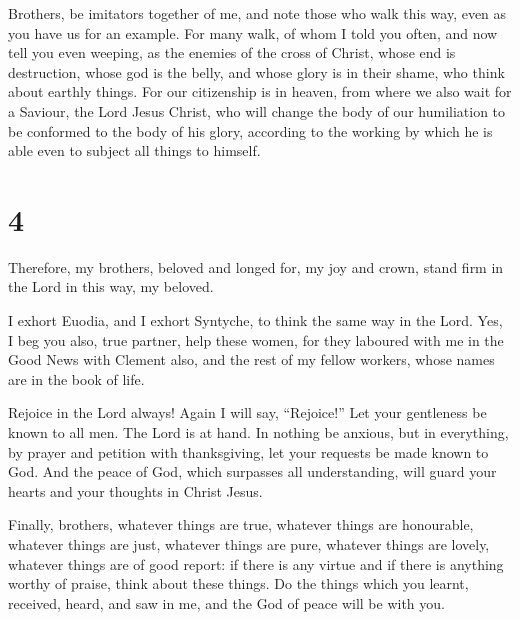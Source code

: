  Brothers, be imitators together of me, and note those who
walk this way, even as you have us for an example.  For
many walk, of whom I told you often, and now tell you even weeping, as
the enemies of the cross of Christ,  whose end is
destruction, whose god is the belly, and whose glory is in their shame,
who think about earthly things.  For our citizenship is in
heaven, from where we also wait for a Saviour, the Lord Jesus Christ,
 who will change the body of our humiliation to be
conformed to the body of his glory, according to the working by which he
is able even to subject all things to himself.

\hypertarget{section-3}{%
\section{4}\label{section-3}}

 Therefore, my brothers, beloved and longed for, my joy and
crown, stand firm in the Lord in this way, my beloved.

 I exhort Euodia, and I exhort Syntyche, to think the same
way in the Lord.  Yes, I beg you also, true partner, help
these women, for they laboured with me in the Good News with Clement
also, and the rest of my fellow workers, whose names are in the book of
life.

 Rejoice in the Lord always! Again I will say, ``Rejoice!''
 Let your gentleness be known to all men. The Lord is at
hand.  In nothing be anxious, but in everything, by prayer
and petition with thanksgiving, let your requests be made known to God.
 And the peace of God, which surpasses all understanding,
will guard your hearts and your thoughts in Christ Jesus.

 Finally, brothers, whatever things are true, whatever
things are honourable, whatever things are just, whatever things are
pure, whatever things are lovely, whatever things are of good report: if
there is any virtue and if there is anything worthy of praise, think
about these things.  Do the things which you learnt,
received, heard, and saw in me, and the God of peace will be with you.

